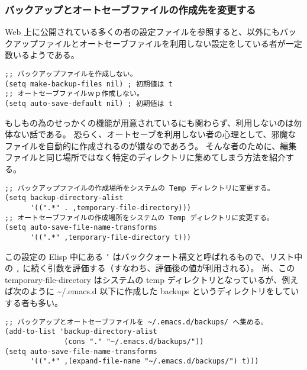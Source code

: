 \subsubsection{バックアップとオートセーブファイルの作成先を変更する}
Web 上に公開されている多くの者の設定ファイルを参照すると、以外にもバックアップファイルとオートセーブファイルを利用しない設定をしている者が一定数いるようである。
\begin{mdframed}[roundcorner=0.50zw,leftmargin=3.00zw,rightmargin=3.00zw,skipabove=0.40zw,skipbelow=0.40zw,innertopmargin=4.00pt,innerbottommargin=4.00pt,innerleftmargin=5.00pt,innerrightmargin=5.00pt,linecolor=gray!020,linewidth=0.50pt,backgroundcolor=gray!20]
\begin{verbatim}
;; バックアップファイルを作成しない。
(setq make-backup-files nil) ; 初期値は t
;; オートセーブファイルｗｐ作成しない。
(setq auto-save-default nil) ; 初期値は t
\end{verbatim}
\end{mdframed}
もしもの為のせっかくの機能が用意されているにも関わらず、利用しないのは勿体ない話である。
恐らく、オートセーブを利用しない者の心理として、邪魔なファイルを自動的に作成されるのが嫌なのであろう。
そんな者のために、編集ファイルと同じ場所ではなく特定のディレクトリに集めてしまう方法を紹介する。
\begin{mdframed}[roundcorner=0.50zw,leftmargin=3.00zw,rightmargin=3.00zw,skipabove=0.40zw,skipbelow=0.40zw,innertopmargin=4.00pt,innerbottommargin=4.00pt,innerleftmargin=5.00pt,innerrightmargin=5.00pt,linecolor=gray!020,linewidth=0.50pt,backgroundcolor=gray!20]
\begin{verbatim}
;; バックアップファイルの作成場所をシステムの Temp ディレクトリに変更する。
(setq backup-directory-alist
      '((".*" . ,temporary-file-directory)))
;; オートセーブファイルの作成場所をシステムの Temp ディレクトリに変更する。
(setq auto-save-file-name-transforms
      '((".*" ,temporary-file-directory t)))
\end{verbatim}
\end{mdframed}
この設定の Elisp 中にある \texttt{'} はバッククォート構文と呼ばれるもので、リスト中の \texttt{,} に続く引数を評価する（すなわち、評価後の値が利用される）。
尚、この temporary-file-directory はシステムの temp ディレクトリとなっているが、例えば次のように \textasciitilde{}/.emacs.d 以下に作成した backups というディレクトリをしていする者も多い。
\begin{mdframed}[roundcorner=0.50zw,leftmargin=3.00zw,rightmargin=3.00zw,skipabove=0.40zw,skipbelow=0.40zw,innertopmargin=4.00pt,innerbottommargin=4.00pt,innerleftmargin=5.00pt,innerrightmargin=5.00pt,linecolor=gray!020,linewidth=0.50pt,backgroundcolor=gray!20]
\begin{verbatim}
;; バックアップとオートセーブファイルを ~/.emacs.d/backups/ へ集める。
(add-to-list 'backup-directory-alist
              (cons "." "~/.emacs.d/backups/"))
(setq auto-save-file-name-transforms
      '((".*" ,(expand-file-name "~/.emacs.d/backups/") t)))
\end{verbatim}
\end{mdframed}
